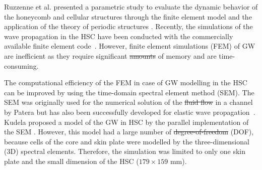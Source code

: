 \documentclass[materials,article,submit,moreauthors,pdftex]{Definitions/mdpi}
\providecommand{\DIFadd}[1]{{\protect\color{blue}{#1}}} %
\providecommand{\DIFdel}[1]{{\protect\color{red}\sout{#1}}}                      %
\providecommand{\DIFaddbegin}{} %
\providecommand{\DIFaddend}{} %
\providecommand{\DIFdelbegin}{} %
\providecommand{\DIFdelend}{} %
\begin{document}
Ruzzenne et al. presented a parametric study to evaluate the dynamic behavior of the honeycomb and cellular structures through the finite element model and the application of the theory of periodic structures \cite{ruzzene2003wave}.
Recently, the simulations of the wave propagation in the HSC have been conducted with the commercially available finite element code~\cite{song2009guided, hosseini2013numerical, tian2015wavenumber, zhao2018wave}.
However, finite element simulations (FEM) of GW are inefficient as they require significant \DIFdelbegin \DIFdel{amounts }\DIFdelend \DIFaddbegin \DIFadd{amount }\DIFaddend of memory and are time-consuming.

The computational efficiency of the FEM in case of GW modelling in the HSC can be improved by using the time-domain spectral element method (SEM).
The SEM was originally used for the numerical solution of the \DIFdelbegin \DIFdel{fluid flow }\DIFdelend \DIFaddbegin \DIFadd{fluid--flow }\DIFaddend in a channel by Patera \cite{patera1984spectral} but has also been successfully developed for elastic wave propagation~\cite{ostachowicz2011guided}.
Kudela proposed a model of the GW in HSC by the parallel implementation of the SEM \cite{kudela2016parallel}.
However, this model had a large number of \DIFdelbegin \DIFdel{degree-of-freedom }\DIFdelend \DIFaddbegin \DIFadd{degrees-of-freedom }\DIFaddend (DOF), because cells of the core and skin plate were modelled by the three-dimensional (3D) spectral elements.
Therefore, the simulation was limited to only one skin plate and the small dimension of the HSC (\(179 \times 159 \) mm).
\end{document}
